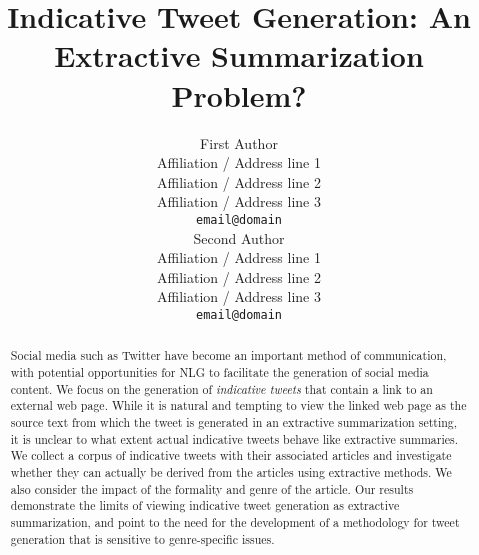 \documentclass[11pt,a4paper]{article}
\title{Indicative Tweet Generation: An Extractive Summarization Problem?}
\author{First Author \\
  Affiliation / Address line 1 \\
  Affiliation / Address line 2 \\
  Affiliation / Address line 3 \\
  {\tt email@domain} \\\And
  Second Author \\
  Affiliation / Address line 1 \\
  Affiliation / Address line 2 \\
  Affiliation / Address line 3 \\
  {\tt email@domain} \\}
\date{}
\begin{document}
\maketitle
\begin{abstract}
Social media such as Twitter have become an important method of communication, with potential opportunities for NLG to facilitate the generation of social media content. We focus on the generation of \emph{indicative tweets} that contain a link to an external web page. While it is natural and tempting to view the linked web page as the source text from which the tweet is generated in an extractive summarization setting, it is unclear to what extent actual indicative tweets behave like extractive summaries. We collect a corpus of indicative tweets with their associated articles and investigate whether they can actually be derived from the articles using extractive methods. We also consider the impact of the formality and genre of the article. Our results demonstrate the limits of viewing indicative tweet generation as extractive summarization, and point to the need for the development of a methodology for tweet generation that is sensitive to genre-specific issues.



\end{abstract}























\end{document}
